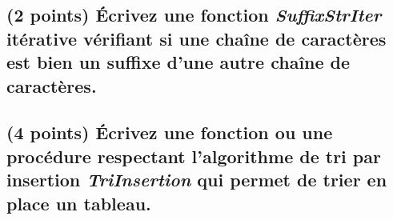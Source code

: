 \documentclass[11pt,a4paper]{article}
\begin{document}
\bigskip

\begin{center}
\end{center}

\bigskip

\subsection{(2 points) \'Ecrivez une fonction \og \textit{SuffixStrIter} \fg{} itérative vérifiant si une chaîne de caractères est bien un suffixe d'une autre chaîne de caractères. }

\bigskip

\begin{center}
\end{center}

\bigskip

\subsection{(4 points) \'Ecrivez une fonction ou une procédure respectant l'algorithme de tri par insertion \og \textit{TriInsertion} \fg{} qui permet de trier en place un tableau. }

\bigskip

\begin{center}
\end{center}
\end{document}
